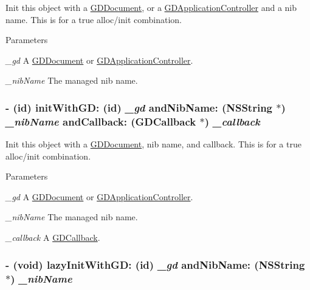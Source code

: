 Init this object with a \hyperlink{interface_g_d_document}{GDDocument}, or a \hyperlink{interface_g_d_application_controller}{GDApplicationController} and a nib name. This is for a true alloc/init combination.


\begin{DoxyParams}{Parameters}
\item[{\em \_\-gd}]A \hyperlink{interface_g_d_document}{GDDocument} or \hyperlink{interface_g_d_application_controller}{GDApplicationController}. \item[{\em \_\-nibName}]The managed nib name. \end{DoxyParams}
\hypertarget{interface_g_d_external_nib_controller_a404eb67212e861a74c1a3cc254489663}{
\subsubsection[{initWithGD:andNibName:andCallback:}]{\setlength{\rightskip}{0pt plus 5cm}-\/ (id) initWithGD: (id) {\em \_\-gd}\/ andNibName: ({\bf NSString} $\ast$) {\em \_\-nibName}\/ andCallback: ({\bf GDCallback} $\ast$) {\em \_\-callback}}}
\label{interface_g_d_external_nib_controller_a404eb67212e861a74c1a3cc254489663}


Init this object with a \hyperlink{interface_g_d_document}{GDDocument}, nib name, and callback. This is for a true alloc/init combination.


\begin{DoxyParams}{Parameters}
\item[{\em \_\-gd}]A \hyperlink{interface_g_d_document}{GDDocument} or \hyperlink{interface_g_d_application_controller}{GDApplicationController}. \item[{\em \_\-nibName}]The managed nib name. \item[{\em \_\-callback}]A \hyperlink{interface_g_d_callback}{GDCallback}. \end{DoxyParams}
\hypertarget{interface_g_d_external_nib_controller_afbf8e576d3002582a58fe45aef1ddb83}{
\subsubsection[{lazyInitWithGD:andNibName:}]{\setlength{\rightskip}{0pt plus 5cm}-\/ (void) lazyInitWithGD: (id) {\em \_\-gd}\/ andNibName: ({\bf NSString} $\ast$) {\em \_\-nibName}}}
\label{interface_g_d_external_nib_controller_afbf8e576d3002582a58fe45aef1ddb83}


